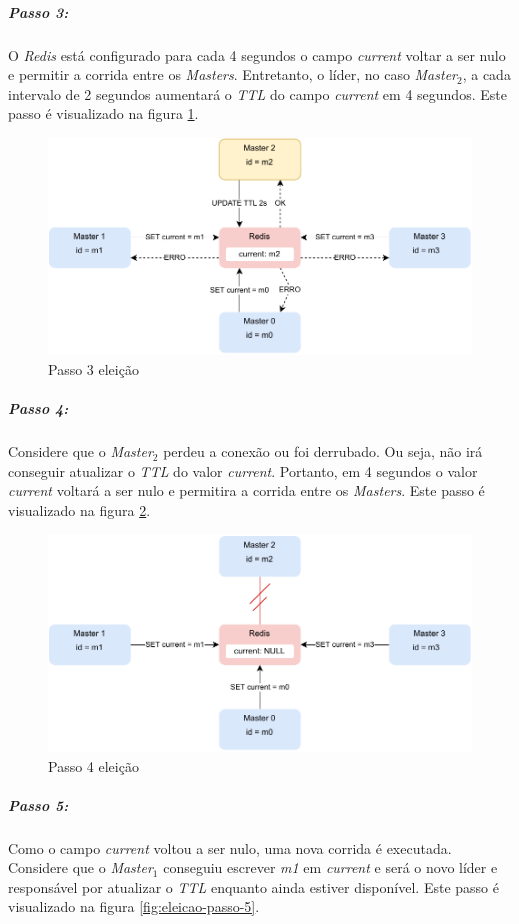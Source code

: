 \documentclass[
	12pt,				%
	openright,			%
	oneside,			%
	a4paper,			%
	brazil				%
	]{abntex2}
\begin{document}
\subparagraph{Passo 3:} O \textit{Redis} está configurado para cada 4 segundos o campo \textit{current} voltar a ser nulo e permitir a corrida entre os \textit{Masters}. Entretanto, o líder, no caso \textit{Master$_2$}, a cada intervalo de 2 segundos aumentará o \textit{TTL} do campo \textit{current} em 4 segundos. Este passo é visualizado na figura \ref{fig:eleicao-passo-3}.

\begin{figure}[h!]
	\caption{\label{fig:eleicao-passo-3}Passo 3 eleição}
	\centering
	\includegraphics[width=.6\linewidth]{assets/eleicao-passo-3.pdf}
\end{figure}

\subparagraph{Passo 4:} Considere que o \textit{Master$_2$} perdeu a conexão ou foi derrubado. Ou seja, não irá conseguir atualizar o \textit{TTL} do valor \textit{current}. Portanto, em 4 segundos o valor \textit{current} voltará a ser nulo e permitira a corrida entre os \textit{Masters}. Este passo é visualizado na figura \ref{fig:eleicao-passo-4}.

\begin{figure}[h!]
	\caption{\label{fig:eleicao-passo-4}Passo 4 eleição}
	\centering
	\includegraphics[width=.6\linewidth]{assets/eleicao-passo-4.pdf}
\end{figure}

\subparagraph{Passo 5:} Como o campo \textit{current} voltou a ser nulo, uma nova corrida é executada. Considere que o \textit{Master$_1$} conseguiu escrever \textit{m1} em \textit{current} e será o novo líder e responsável por atualizar o \textit{TTL} enquanto ainda estiver disponível. Este passo é visualizado na figura \ref{fig:eleicao-passo-5}.
\end{document}
